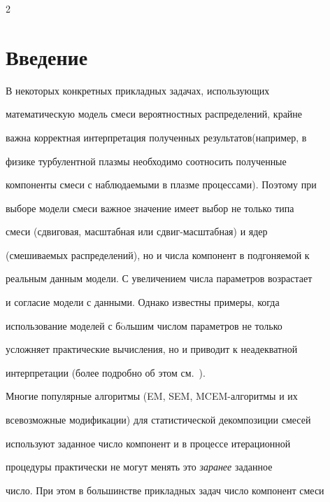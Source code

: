       \begin{multicols}{2}

      

            \label{st\stat}









\section{Введение}



В некоторых конкретных прикладных задачах, использующих

математическую модель смеси ве\-роятностных распределений, крайне

важна кор\-ректная интерпретация полученных результатов\linebreak (например, в

физике турбулентной плазмы необходимо соотносить полученные

компоненты смеси с наблюдаемыми в плазме процессами). Поэтому при

выборе модели смеси важное значение имеет выбор не только типа

смеси (сдвиговая, масштабная или сдвиг-масштабная) и ядер

(смешиваемых распределений), но и числа компонент в подгоняемой к

реальным данным модели. С увеличением числа параметров возрастает

и согласие модели с данными. Однако известны примеры, когда

использование моделей с б$\acute{\mbox{o}}$льшим числом параметров не только

усложняет практические вычисления, но и приводит к неадекватной

интерпретации (более подробно об этом см.~\cite{Korolev2007, Korolev2010}).



Многие популярные алгоритмы (EM, SEM, MCEM-ал\-го\-рит\-мы и их

всевозможные модификации) для статистической декомпозиции смесей

используют заданное число компонент и в процессе итерационной

процедуры практически не могут менять это \textit{заранее} заданное

число. При этом в большинстве прикладных задач число компонент смеси


\end{multicols}

